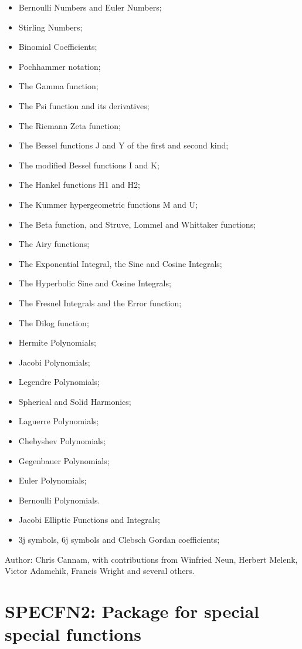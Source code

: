 \begin{itemize}
\item Bernoulli Numbers and Euler Numbers;
\item Stirling Numbers;
\item Binomial Coefficients;
\item Pochhammer notation;
\item The Gamma function;
\item The Psi function and its derivatives;
\item The Riemann Zeta function;
\item The Bessel functions J and Y of the first and second kind;
\item The modified Bessel functions I and K;
\item The Hankel functions H1 and H2;
\item The Kummer hypergeometric functions M and U;
\item The Beta function, and Struve, Lommel and Whittaker functions;
\item The Airy functions;
\item The Exponential Integral, the Sine and Cosine Integrals;
\item The Hyperbolic Sine and Cosine Integrals;
\item The Fresnel Integrals and the Error function;
\item The Dilog function;
\item Hermite Polynomials;
\item Jacobi Polynomials;
\item Legendre Polynomials;
\item Spherical and Solid Harmonics;
\item Laguerre Polynomials;
\item Chebyshev Polynomials;
\item Gegenbauer Polynomials;
\item Euler  Polynomials;
\item Bernoulli Polynomials.
\item Jacobi Elliptic Functions and Integrals;
\item 3j symbols, 6j symbols and Clebsch Gordan coefficients;
\end{itemize}

Author:  Chris Cannam, with contributions from Winfried Neun, Herbert
Melenk, Victor Adamchik, Francis Wright and several others.

\section{SPECFN2: Package for special special functions} 

